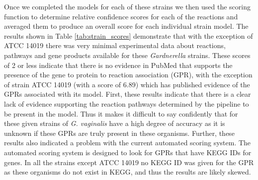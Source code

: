 \indent Once we completed the models for each of these strains we then used the scoring function to determine relative confidence scores for each of the reactions and averaged them to produce an overall score for each individual strain model. The results shown in Table \ref{tab:strain_scores} demonstrate that with the exception of ATCC 14019 there was very minimal experimental data about reactions, pathways and gene products available for these \textit{Gardnerella} strains. These scores of 2 or less indicate that there is no evidence in PubMed that supports the presence of the gene to protein to reaction association (GPR), with the exception of strain ATCC 14019 (with a score of 6.89) which has published evidence of the GPRs associated with its model. First, these results indicate that there is a clear lack of evidence supporting the reaction pathways determined by the pipeline to be present in the model. Thus it makes it difficult to say confidently that for these given strains of \textit{G. vaginalis} have a high degree of accuracy as it is unknown if these GPRs are truly present in these organisms. Further, these results also indicated a problem with the current automated scoring system. The automated scoring system is designed to look for GPRs that have KEGG IDs for genes. In all the strains except ATCC 14019 no KEGG ID was given for the GPR as these organisms do not exist in KEGG, and thus the results are likely skewed. \\


